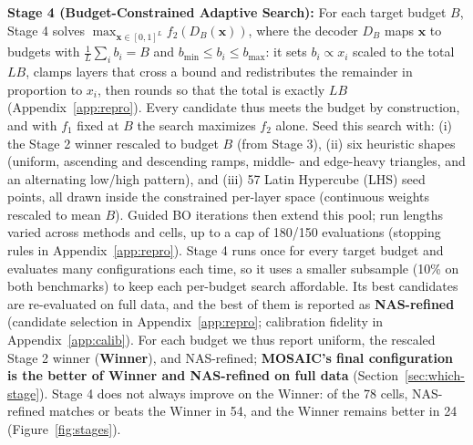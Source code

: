 \documentclass[11pt]{article}
\begin{document}
\begin{table}[htbp]
  \centering
  \scriptsize
  \setlength{\tabcolsep}{2.6pt}
  \renewcommand{\arraystretch}{0.92}
  
  \caption{\textbf{One search, many budgets.} Stage 3: the Stage 2 winner, found once at its natural average budget and rescaled to every target budget with no further search. Stage 4: NAS-refined, the best configuration of the budget-constrained search, available only at budgets where it ran. MOSAIC: its final configuration, the better of Winner and NAS-refined (chosen per budget), at the same budgets as Stage 4. Wins: budgets where the configuration beats uniform on full data; $\Delta$: mean gain over uniform. Llama-3-8B-Instruct; Mistral-7B-Instruct-v0.2 is in Table~\ref{tab:app-stages-mistral}.}
  \label{tab:transfer}
\end{table}

\textbf{Stage 4 (Budget-Constrained Adaptive Search):} For each target budget $B$, Stage 4 solves $\max_{\mathbf{x} \in [0,1]^L} f_2(D_B(\mathbf{x}))$, where the decoder $D_B$ maps $\mathbf{x}$ to budgets with $\frac{1}{L}\sum_i b_i = B$ and $b_{\min} \le b_i \le b_{\max}$: it sets $b_i \propto x_i$ scaled to the total $LB$, clamps layers that cross a bound and redistributes the remainder in proportion to $x_i$, then rounds so that the total is exactly $LB$ (Appendix~\ref{app:repro}). Every candidate thus meets the budget by construction, and with $f_1$ fixed at $B$ the search maximizes $f_2$ alone. Seed this search with: (i) the Stage 2 winner rescaled to budget $B$ (from Stage 3), (ii) six heuristic shapes (uniform, ascending and descending ramps, middle- and edge-heavy triangles, and an alternating low/high pattern), and (iii) 57 Latin Hypercube (LHS) seed points, all drawn inside the constrained per-layer space (continuous weights rescaled to mean $B$). Guided BO iterations then extend this pool; run lengths varied across methods and cells, up to a cap of 180/150 evaluations (stopping rules in Appendix~\ref{app:repro}). Stage 4 runs once for every target budget and evaluates many configurations each time, so it uses a smaller subsample (10\% on both benchmarks) to keep each per-budget search affordable. Its best candidates are re-evaluated on full data, and the best of them is reported as \textbf{NAS-refined} (candidate selection in Appendix~\ref{app:repro}; calibration fidelity in Appendix~\ref{app:calib}). For each budget we thus report uniform, the rescaled Stage 2 winner (\textbf{Winner}), and NAS-refined; \textbf{MOSAIC's final configuration is the better of Winner and NAS-refined on full data} (Section~\ref{sec:which-stage}). Stage 4 does not always improve on the Winner: of the 78 cells, NAS-refined matches or beats the Winner in 54, and the Winner remains better in 24 (Figure~\ref{fig:stages}).
\end{document}
